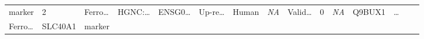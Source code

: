 \documentclass[
]{article}
\begin{document}
\begin{longtable}[]{@{}lllllllllllllll@{}}
\begin{minipage}[t]{0.04\columnwidth}
marker\strut
\end{minipage} & \begin{minipage}[t]{0.02\columnwidth}\raggedright
2\strut
\end{minipage} & \begin{minipage}[t]{0.05\columnwidth}\raggedright
Ferro\ldots{}\strut
\end{minipage} & \begin{minipage}[t]{0.05\columnwidth}\raggedright
HGNC:\ldots{}\strut
\end{minipage} & \begin{minipage}[t]{0.05\columnwidth}\raggedright
ENSG0\ldots{}\strut
\end{minipage} & \begin{minipage}[t]{0.05\columnwidth}\raggedright
Up-re\ldots{}\strut
\end{minipage} & \begin{minipage}[t]{0.04\columnwidth}\raggedright
Human\strut
\end{minipage} & \begin{minipage}[t]{0.05\columnwidth}\raggedright
\emph{NA}\strut
\end{minipage} & \begin{minipage}[t]{0.05\columnwidth}\raggedright
Valid\ldots{}\strut
\end{minipage} & \begin{minipage}[t]{0.05\columnwidth}\raggedright
0\strut
\end{minipage} & \begin{minipage}[t]{0.05\columnwidth}\raggedright
\emph{NA}\strut
\end{minipage} & \begin{minipage}[t]{0.05\columnwidth}\raggedright
Q9BUX1\strut
\end{minipage} & \begin{minipage}[t]{0.02\columnwidth}\raggedright
\ldots{}\strut
\end{minipage}\tabularnewline
\begin{minipage}[t]{0.05\columnwidth}\raggedright
Ferro\ldots{}\strut
\end{minipage} & \begin{minipage}[t]{0.04\columnwidth}\raggedright
SLC40A1\strut
\end{minipage} & \begin{minipage}[t]{0.04\columnwidth}\raggedright
marker\strut
\end{minipage} & \begin{minipage}[t]{0.02\columnwidth}\raggedright

\end{minipage}
\end{longtable}
\end{document}

